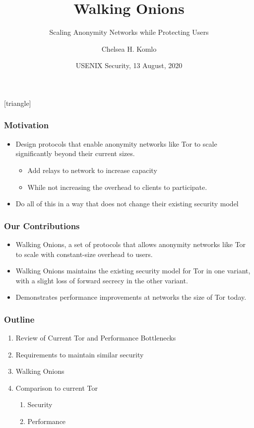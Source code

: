 \documentclass[hyperref={pdfpagelabels=true},table,dvipsnames,14pt,aspectratio=169]{beamer}
\title{Walking Onions}
\subtitle{Scaling Anonymity Networks while Protecting Users}
\author[Chelsea Komlo]{Chelsea H. Komlo}
\institute{\small Joint work with Nick Mathewson, Ian Goldberg}
\date{\small USENIX Security, 13 August, 2020}
\begin{document}
[triangle]

\begin{frame}
        \thispagestyle{empty}
        \maketitle
\end{frame}


\begin{frame}
\frametitle{Motivation}
  \begin{itemize}
    \item Design protocols that enable anonymity networks like Tor to scale
      significantly beyond their current sizes.
        \begin{itemize}
          \item Add relays to network to increase capacity
          \item While not increasing the overhead to clients to participate.
        \end{itemize}
    \item Do all of this in a way that does not change their existing security model
  \end{itemize}
\end{frame}

\begin{frame}
\frametitle{Our Contributions}
  \begin{itemize}
    \item Walking Onions, a set of protocols that allows anonymity networks
      like Tor to scale with constant-size overhead to users.
    \item Walking Onions maintains the existing security model for Tor in one
      variant, with a slight loss of forward secrecy in the other variant.
    \item Demonstrates performance improvements at networks the size of Tor
      today.
  \end{itemize}
\end{frame}

\begin{frame}
\frametitle{Outline}
  \begin{enumerate}
    \item Review of Current Tor and Performance Bottlenecks
    \item Requirements to maintain similar security
    \item Walking Onions
    \item Comparison to current Tor
      \begin{enumerate}
        \item Security
        \item Performance
      \end{enumerate}
  \end{enumerate}
\end{frame}
\end{document}
